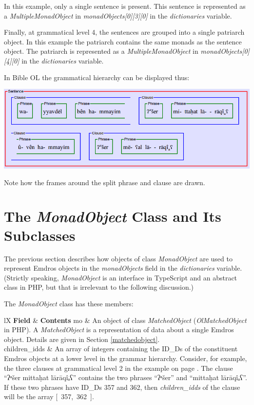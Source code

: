 \documentclass[11pt,oneside,a4paper]{memoir}
\makeatletter
\newcommand{\headii}[2]{\textbf{#1} & \textbf{#2}}
\newenvironment{my-tabu}[2]{%
\begin{center}
\begin{tabu}{@{}#1@{}}
  \toprule
  #2\\\addlinespace[-1mm]
  \midrule
}{%
\addlinespace[-1mm]\bottomrule
\end{tabu}
\end{center}%
}
\makeatother
\begin{document}
In this example, only a single sentence is present.
This sentence is represented as a \emph{MultipleMonadObject} in \emph{monadObjects[0][3][0]} in the
\emph{dictionaries} variable.

Finally, at grammatical level 4, the sentences are grouped into a single patriarch object. In this
example the patriarch contains the same monads as the sentence object. The patriarch is represented
as a \emph{MultipleMonadObject} in \emph{monadObjects[0][4][0]} in the
\emph{dictionaries} variable.


In Bible OL the grammatical hierarchy can be displayed thus:

\begin{center}
  \includegraphics[width=1.0\textwidth]{gen1_7.png}
\end{center}

Note how the frames around the split phrase and clause are drawn.

\section{The \emph{MonadObject} Class and Its Subclasses}\label{MonadObject}

The previous section describes how objects of class \emph{MonadObject} are used to represent Emdros
objects in the \emph{monadObjects} field in the \emph{dictionaries} variable. (Strictly speaking,
\emph{MonadObject} is an interface in TypeScript and an abstract class in PHP, but that is
irrelevant to the following discussion.)

The \emph{MonadObject} class has these members:

\begin{my-tabu}{lX}{ \headii{Field}{Contents} }
mo & An object of class \emph{MatchedObject} (\emph{OlMatchedObject} in PHP). A \emph{MatchedObject}
is a representation of data about a single Emdros object. Details are given in Section
\ref{matchedobject}.\\

children\_idds & An array of integers containing the ID\_Ds of the constituent Emdros
objects at a lower level in the grammar hierarchy. Consider, for example, the three clauses at
grammatical level 2 in the example on page \pageref{clause-example}. The clause ``ʔᵃšer mittaḥat
lārāqîₐʕ'' contains the two phrases ``ʔᵃšer'' and ``mittaḥat lārāqîₐʕ''. If these two phrases have
ID\_Ds 357 and 362, then \emph{children\_idds} of the clause will be the array
[~357,~362~].\\
\end{my-tabu}
\end{document}
